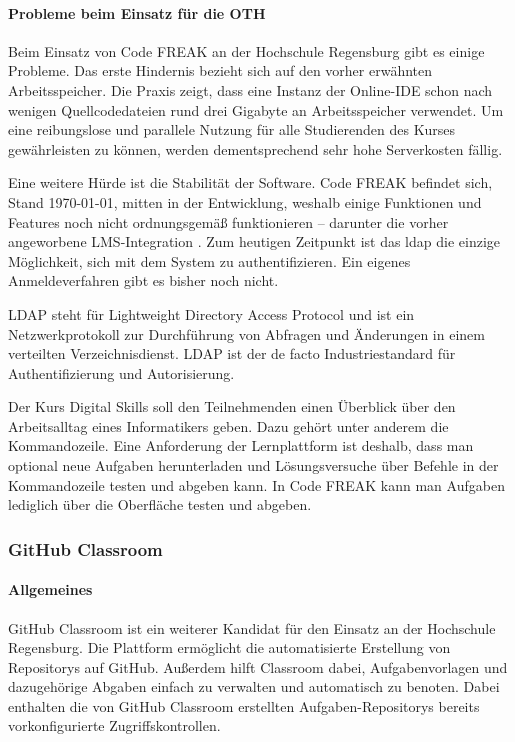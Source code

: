 \paragraph{Probleme beim Einsatz für die OTH}
Beim Einsatz von Code FREAK an der Hochschule Regensburg gibt es einige
Probleme. Das erste Hindernis bezieht sich auf den vorher erwähnten
Arbeitsspeicher. Die Praxis zeigt, dass eine Instanz der Online-IDE schon nach
wenigen Quellcodedateien rund drei Gigabyte an Arbeitsspeicher verwendet. Um
eine reibungslose und parallele Nutzung für alle Studierenden des Kurses
gewährleisten zu können, werden dementsprechend sehr hohe Serverkosten fällig. 
\parencite{codefreak-memory-problem}

Eine weitere Hürde ist die Stabilität der Software. Code FREAK befindet sich,
Stand \today, mitten in der Entwicklung, weshalb einige Funktionen und Features
noch nicht ordnungsgemäß funktionieren -- darunter die vorher angeworbene
LMS-Integration \parencite{codefreak-docs}. Zum heutigen Zeitpunkt ist das
\ac{ldap} die einzige Möglichkeit, sich mit dem System zu authentifizieren. Ein
eigenes Anmeldeverfahren gibt es bisher noch nicht.

LDAP steht für Lightweight Directory Access Protocol und ist ein
Netzwerkprotokoll zur Durchführung von Abfragen und Änderungen in einem 
verteilten Verzeichnisdienst. LDAP ist der de facto Industriestandard für
Authentifizierung und Autorisierung. \parencite{ldap}

Der Kurs Digital Skills soll den Teilnehmenden einen Überblick über den
Arbeitsalltag eines Informatikers geben. Dazu gehört unter anderem die
Kommandozeile. Eine Anforderung der Lernplattform ist deshalb, dass man
optional neue Aufgaben herunterladen und Lösungsversuche über Befehle in der
Kommandozeile testen und abgeben kann. In Code FREAK kann man Aufgaben lediglich
über die Oberfläche testen und abgeben.

\newpage
\subsubsection{GitHub Classroom}
\paragraph{Allgemeines}
GitHub Classroom ist ein weiterer Kandidat für den Einsatz an der
Hochschule Regensburg. Die Plattform ermöglicht die automatisierte
Erstellung von Repositorys auf GitHub. Außerdem hilft Classroom dabei,
Aufgabenvorlagen und dazugehörige Abgaben einfach zu verwalten und automatisch
zu benoten. Dabei enthalten die von GitHub Classroom erstellten
Aufgaben-Repositorys bereits vorkonfigurierte Zugriffskontrollen.
\parencite{github-classroom-startseite}

